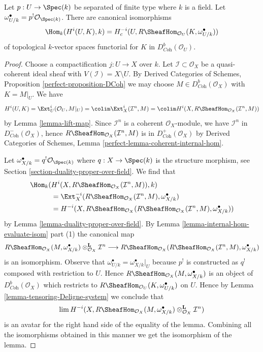 \begin{lemma}
\label{lemma-duality-compact-support}
Let $p : U \to \Spec(k)$ be separated of finite type where $k$ is a field.
Let $\omega_{U/k}^\bullet = p^!\mathcal{O}_{\Spec(k)}$.
There are canonical isomorphisms
$$
\Hom_k(H^i(U, K), k) =
H^{-i}_c(U, R\SheafHom_{\mathcal{O}_U}(K, \omega_{U/k}^\bullet))
$$
of topological $k$-vector spaces
functorial for $K$ in $D^b_{\textit{Coh}}(\mathcal{O}_U)$.
\end{lemma}

\begin{proof}
Choose a compactification $j : U \to X$ over $k$. Let
$\mathcal{I} \subset \mathcal{O}_X$ be a quasi-coherent ideal
sheaf with $V(\mathcal{I}) = X \setminus U$.
By Derived Categories of Schemes, Proposition \ref{perfect-proposition-DCoh}
we may choose $M \in D^b_{\textit{Coh}}(\mathcal{O}_X)$
with $K = M|_U$. We have
$$
H^i(U, K) =
\Ext^i_U(\mathcal{O}_U, M|_U) =
\colim \Ext^i_X(\mathcal{I}^n, M) =
\colim H^i(X, R\SheafHom_{\mathcal{O}_X}(\mathcal{I}^n, M))
$$
by Lemma \ref{lemma-lift-map}.
Since $\mathcal{I}^n$ is a coherent $\mathcal{O}_X$-module,
we have $\mathcal{I}^n$ in $D^-_{\textit{Coh}}(\mathcal{O}_X)$,
hence $R\SheafHom_{\mathcal{O}_X}(\mathcal{I}^n, M)$ is in
$D^+_{\textit{Coh}}(\mathcal{O}_X)$ by
Derived Categories of Schemes, Lemma
\ref{perfect-lemma-coherent-internal-hom}.

\medskip\noindent
Let $\omega_{X/k}^\bullet = q^!\mathcal{O}_{\Spec(k)}$ where
$q : X \to \Spec(k)$ is the structure morphism, see
Section \ref{section-duality-proper-over-field}. We find that
\begin{align*}
\Hom_k(
&
H^i(X, R\SheafHom_{\mathcal{O}_X}(\mathcal{I}^n, M)), k) \\
& =
\Ext^{-i}_X(R\SheafHom_{\mathcal{O}_X}(\mathcal{I}^n, M),
\omega_{X/k}^\bullet) \\
& =
H^{-i}(X, R\SheafHom_{\mathcal{O}_X}(R\SheafHom_{\mathcal{O}_X}(
\mathcal{I}^n, M), \omega_{X/k}^\bullet))
\end{align*}
by Lemma \ref{lemma-duality-proper-over-field}. By
Lemma \ref{lemma-internal-hom-evaluate-isom} part (1) the canonical map
$$
R\SheafHom_{\mathcal{O}_X}(M, \omega_{X/k}^\bullet)
\otimes_{\mathcal{O}_X}^\mathbf{L} \mathcal{I}^n
\longrightarrow
R\SheafHom_{\mathcal{O}_X}(R\SheafHom_{\mathcal{O}_X}(
\mathcal{I}^n, M), \omega_{X/k}^\bullet)
$$
is an isomorphism. Observe that
$\omega^\bullet_{U/k} = \omega^\bullet_{X/k}|_U$
because $p^!$ is constructed as $q^!$ composed with restriction to $U$.
Hence $R\SheafHom_{\mathcal{O}_X}(M, \omega_{X/k}^\bullet)$ is
an object of $D^b_{\textit{Coh}}(\mathcal{O}_X)$ which restricts
to $R\SheafHom_{\mathcal{O}_U}(K, \omega_{U/k}^\bullet)$ on $U$.
Hence by Lemma \ref{lemma-tensoring-Deligne-system} we conclude that
$$
\lim H^{-i}(X, R\SheafHom_{\mathcal{O}_X}(M, \omega_{X/k}^\bullet)
\otimes_{\mathcal{O}_X}^\mathbf{L} \mathcal{I}^n)
$$
is an avatar for the right hand side of the equality of the lemma.
Combining all the isomorphisms obtained in this manner we get
the isomorphism of the lemma.
\end{proof}